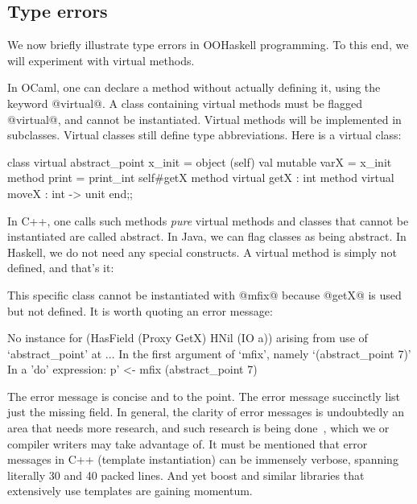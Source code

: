 \medskip

\subsection{Type errors}

We now briefly illustrate type errors in OOHaskell programming.  To
this end, we will experiment with virtual methods.

In OCaml, one can declare a method without actually defining it, using
the keyword @virtual@. A class containing virtual methods must be
flagged @virtual@, and cannot be instantiated. Virtual methods will be
implemented in subclasses. Virtual classes still define type
abbreviations. Here is a virtual class:

\begin{code}
 class virtual abstract_point x_init =
   object (self)
     val mutable varX = x_init
     method print = print_int self#getX
     method virtual getX : int
     method virtual moveX : int -> unit
   end;;
\end{code}

\noindent
In C++, one calls such methods \emph{pure} virtual methods and classes
that cannot be instantiated are called abstract. In Java, we can flag
classes as being abstract. In Haskell, we do not need any special
constructs. A virtual method is simply not defined, and that's it:


\noindent
This specific class cannot be instantiated with @mfix@ because @getX@
is used but not defined. It is worth quoting an error message:

\begin{code}
 No instance for (HasField (Proxy GetX) HNil (IO a))
   arising from use of `abstract_point' at ...
 In the first argument of `mfix', namely `(abstract_point 7)'
 In a 'do' expression: p' <- mfix (abstract_point 7)
\end{code}

The error message is concise and to the point. The error message
succinctly list just the missing field. In general, the clarity of
error messages is undoubtedly an area that needs more research, and
such research is being done~\cite{SSW04}, which we or compiler writers
may take advantage of. It must be mentioned that error messages in C++
(template instantiation) can be immensely verbose, spanning literally
30 and 40 packed lines. And yet boost and similar libraries that
extensively use templates are gaining momentum.


